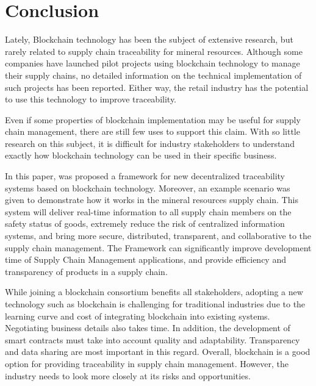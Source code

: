 \section{Conclusion} \label{sec:Conclusion}

Lately, Blockchain technology has been the subject of extensive research, but rarely related to supply chain traceability for mineral resources. Although some companies have launched pilot projects using blockchain technology to manage their supply chains, no detailed information on the technical implementation of such projects has been reported. Either way, the retail industry has the potential to use this technology to improve traceability.

Even if some properties of blockchain implementation may be useful for supply chain management, there are still few uses to support this claim. With so little research on this subject, it is difficult for industry stakeholders to understand exactly how blockchain technology can be used in their specific business.

In this paper, was proposed a framework for new decentralized traceability systems based on blockchain technology. Moreover, an example scenario was given to demonstrate how it works in the mineral resources supply chain. This system will deliver real-time information to all supply chain members on the safety status of goods, extremely reduce the risk of centralized information systems, and bring more secure, distributed, transparent, and collaborative to the supply chain management. The Framework can significantly improve development time of Supply Chain Management applications, and provide efficiency and transparency of products in a supply chain.

While joining a blockchain consortium benefits all stakeholders, adopting a new technology such as blockchain is challenging for traditional industries due to the learning curve and cost of integrating blockchain into existing systems. Negotiating business details also takes time. In addition, the development of smart contracts must take into account quality and adaptability. Transparency and data sharing are most important in this regard. Overall, blockchain is a good option for providing traceability in supply chain management. However, the industry needs to look more closely at its risks and opportunities.